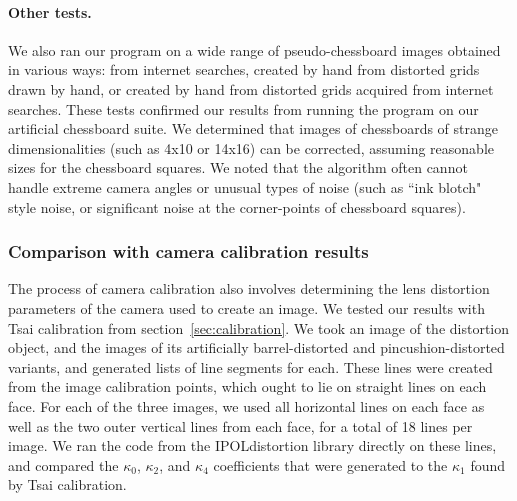 \paragraph{Other tests.}
We also ran our program on a wide range of pseudo-chessboard images obtained in various ways: from internet searches, created by hand from distorted grids drawn by hand, or created by hand from distorted grids acquired from internet searches. These tests confirmed our results from running the program on our artificial chessboard suite. We determined that images of chessboards of strange dimensionalities (such as 4x10 or 14x16) can be corrected, assuming reasonable sizes for the chessboard squares. We noted that the algorithm often cannot handle extreme camera angles or unusual types of noise (such as ``ink blotch" style noise, or significant noise at the corner-points of chessboard squares).

\subsubsection{Comparison with camera calibration results}

The process of camera calibration also involves determining the lens distortion parameters of the camera used to create an image. We tested our results with Tsai calibration from section~\ref{sec:calibration}. We took an image of the distortion object, and the images of its artificially barrel-distorted and pincushion-distorted variants, and generated lists of line segments for each. These lines were created from the image calibration points, which ought to lie on straight lines on each face. For each of the three images, we used all horizontal lines on each face as well as the two outer vertical lines from each face, for a total of 18 lines per image. We ran the code from the IPOLdistortion library directly on these lines, and compared the $\kappa_{0}$, $\kappa_{2}$, and $\kappa_{4}$ coefficients that were generated to the $\kappa_{1}$ found by Tsai calibration.

